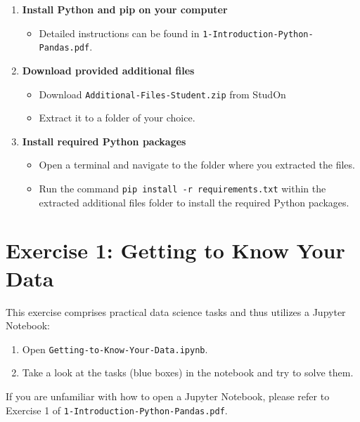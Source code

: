 \documentclass[
english,
smallborders
]{i6prcsht}
\begin{document}
\begin{enumerate}
	\item \textbf{Install Python and pip on your computer}

	      \begin{itemize}
		      \item Detailed instructions can be found in \texttt{1-Introduction-Python-Pandas.pdf}.
	      \end{itemize}

	\item \textbf{Download provided additional files}

	      \begin{itemize}
		      \item Download \texttt{Additional-Files-Student.zip} from StudOn
		      \item Extract it to a folder of your choice.
	      \end{itemize}

	\item \textbf{Install required Python packages}

	      \begin{itemize}
		      \item Open a terminal and navigate to the folder where you extracted the files.
		      \item Run the command \texttt{pip install -r requirements.txt} within the extracted additional files folder to install the required Python packages.
	      \end{itemize}


\end{enumerate}

\section*{Exercise 1: Getting to Know Your Data}

This exercise comprises practical data science tasks and thus utilizes a Jupyter Notebook:

\begin{enumerate}
	\item Open \texttt{Getting-to-Know-Your-Data.ipynb}.
	\item Take a look at the tasks (blue boxes) in the notebook and try to solve them.
\end{enumerate}

If you are unfamiliar with how to open a Jupyter Notebook, please refer to Exercise 1 of \texttt{1-Introduction-Python-Pandas.pdf}.
\end{document}
